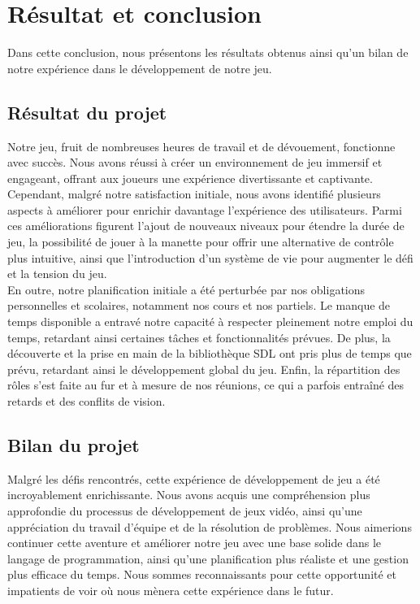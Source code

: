 \documentclass[12pt,a4paper]{article}
\begin{document}
    \newpage

    \section{Résultat et conclusion}
        \tabto{1cm} Dans cette conclusion, nous présentons les résultats obtenus ainsi qu'un bilan de notre expérience dans le développement de notre jeu.\\

        \subsection{Résultat du projet}
            \tabto{1cm} Notre jeu, fruit de nombreuses heures de travail et de dévouement, fonctionne avec succès. Nous avons réussi à créer un environnement de jeu immersif et engageant, offrant aux joueurs une expérience divertissante et captivante. Cependant, malgré notre satisfaction initiale, nous avons identifié plusieurs aspects à améliorer pour enrichir davantage l'expérience des utilisateurs. Parmi ces améliorations figurent l'ajout de nouveaux niveaux pour étendre la durée de jeu, la possibilité de jouer à la manette pour offrir une alternative de contrôle plus intuitive, ainsi que l'introduction d'un système de vie pour augmenter le défi et la tension du jeu.\\
            
            En outre, notre planification initiale a été perturbée par nos obligations personnelles et scolaires, notamment nos cours et nos partiels. Le manque de temps disponible a entravé notre capacité à respecter pleinement notre emploi du temps, retardant ainsi certaines tâches et fonctionnalités prévues. De plus, la découverte et la prise en main de la bibliothèque SDL ont pris plus de temps que prévu, retardant ainsi le développement global du jeu. Enfin, la répartition des rôles s'est faite au fur et à mesure de nos réunions, ce qui a parfois entraîné des retards et des conflits de vision.\\

        \subsection{Bilan du projet}
            \tabto{1cm} Malgré les défis rencontrés, cette expérience de développement de jeu a été incroyablement enrichissante. Nous avons acquis une compréhension plus approfondie du processus de développement de jeux vidéo, ainsi qu'une appréciation du travail d'équipe et de la résolution de problèmes. Nous aimerions continuer cette aventure et améliorer notre jeu avec une base solide dans le langage de programmation, ainsi qu'une planification plus réaliste et une gestion plus efficace du temps. Nous sommes reconnaissants pour cette opportunité et impatients de voir où nous mènera cette expérience dans le futur.\\

    \newpage
\end{document}
